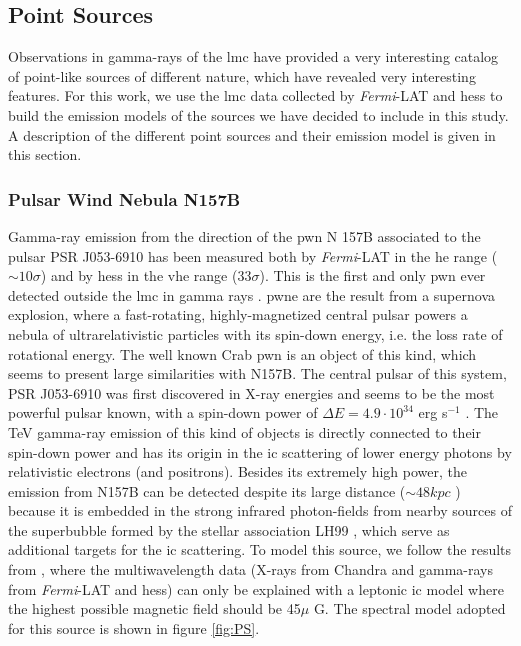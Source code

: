 \documentclass[main.tex]{subfiles}
\begin{document}
\subsection{Point Sources}\label{sec:point}

Observations in gamma-rays of the \gls{lmc} have provided a very interesting catalog of point-like sources of different nature, which have revealed very interesting features. For this work, we use the \gls{lmc} data collected by \textit{Fermi}-LAT \cite{2010FermiLATLMC11months} \cite{2016LMCFermiLAT} and \gls{hess} \cite{2012HESSLMC} \cite{2015HESSTeVLMC} \cite{2017HESSLMCP3} to build the emission models of the sources we have decided to include in this study. A description of the different point sources and their emission model is given in this section.

\subsubsection{Pulsar Wind Nebula N157B}

Gamma-ray emission from the direction of the \gls{pwn} N 157B associated to the pulsar  PSR J053-6910 has been measured both by \textit{Fermi}-LAT in the \gls{he} range ($\sim 10 \sigma$) and by \gls{hess} in the \gls{vhe} range ($33 \sigma$). This is the first and only \gls{pwn} ever detected outside the \gls{lmc} in gamma rays \cite{2012HESSN157B}. \gls{pwne} are the result from  a supernova explosion, where a fast-rotating, highly-magnetized central pulsar powers a nebula of ultrarelativistic particles with its spin-down energy, i.e. the loss rate of rotational energy. The well known Crab \gls{pwn} is an object of this kind, which seems to present large similarities with N157B. The central pulsar of this system, PSR J053-6910 was first discovered in X-ray energies and seems to be the most powerful pulsar known, with a spin-down power of $\Delta E = 4.9 \cdot 10^{34} $ erg s$^{-1}$ \cite{1998PulsarN157B}. The TeV gamma-ray emission of this kind of objects is directly connected to their spin-down power and has its origin in the \gls{ic} scattering of lower energy photons by relativistic electrons (and positrons). Besides its extremely high power, the emission from N157B can be detected despite its large distance ($\sim 48 kpc$ \cite{2006N157Bdistance}) because it is embedded in the strong infrared photon-fields from nearby sources of the superbubble formed by the stellar association LH99 \cite{}, which serve as additional targets for the \gls{ic} scattering.
To model this source, we follow the results from \cite{2015HESSTeVLMC}, where the multiwavelength data (X-rays from Chandra \cite{2001ChandraN157B} and gamma-rays from \textit{Fermi}-LAT and \gls{hess}) can only be explained with a leptonic \gls{ic} model where the highest possible magnetic field should be 45$\mu$ G. The  spectral model adopted for this source is shown in figure \ref{fig:PS}.
\end{document}
